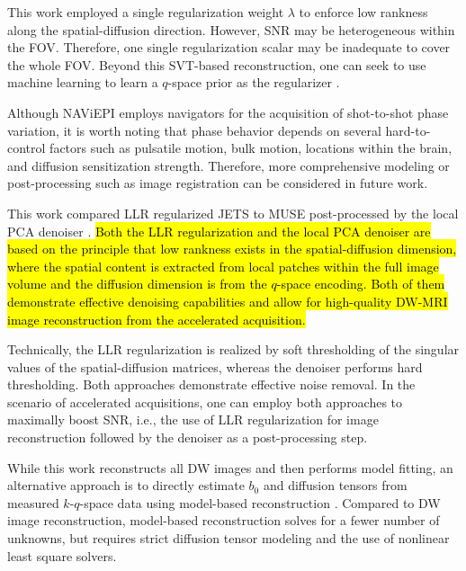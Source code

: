 \documentclass[preprint,12pt,authoryear,review]{elsarticle}
\begin{document}
    This work employed a single regularization weight $\lambda$
    to enforce low rankness along the spatial-diffusion direction.
    However, SNR may be heterogeneous within the FOV.
    Therefore, one single regularization scalar may be inadequate
    to cover the whole FOV.
    Beyond this SVT-based reconstruction,
    one can seek to use machine learning to
    learn a $q$-space prior as the regularizer
    \citep{hammernik_2018_varnet,lam_2019_mrsi,mani_2021_qmodel}.

    Although NAViEPI employs navigators for
    the acquisition of shot-to-shot phase variation,
    it is worth noting that phase behavior depends on
    several hard-to-control factors
    such as pulsatile motion, bulk motion,
    locations within the brain, and
    diffusion sensitization strength.
    Therefore, more comprehensive modeling or post-processing
    such as image registration can be considered in future work.

    This work compared LLR regularized JETS to
    MUSE post-processed by the local PCA denoiser
    \citep{cordero_2019_cplxdwi}.
    \hl{Both the LLR regularization and the local PCA denoiser
    are based on the principle that low rankness exists
    in the spatial-diffusion dimension,
    where the spatial content is extracted from local patches
    within the full image volume
    and the diffusion dimension is from the $q$-space encoding.
    Both of them demonstrate effective denoising capabilities
    and allow for high-quality DW-MRI image reconstruction
    from the accelerated acquisition.}

    Technically, the LLR regularization is realized
    by soft thresholding of the singular values
    of the spatial-diffusion matrices, whereas
    the denoiser performs hard thresholding.
    Both approaches demonstrate effective noise removal.
    In the scenario of accelerated acquisitions,
    one can employ both approaches to maximally boost SNR,
    i.e., the use of LLR regularization for image reconstruction
    followed by the denoiser as a post-processing step.

    While this work reconstructs all DW images and
    then performs model fitting,
    an alternative approach is to directly estimate
    $b_0$ and diffusion tensors
    from measured $k$-$q$-space data
    using model-based reconstruction
    \citep{knoll_2015_mobadiff,dong_2018_mobadiff,shafieizargar_2023_adept}.
    Compared to DW image reconstruction,
    model-based reconstruction solves for a fewer number of unknowns,
    but requires strict diffusion tensor modeling
    and the use of nonlinear least square solvers.
\end{document}
